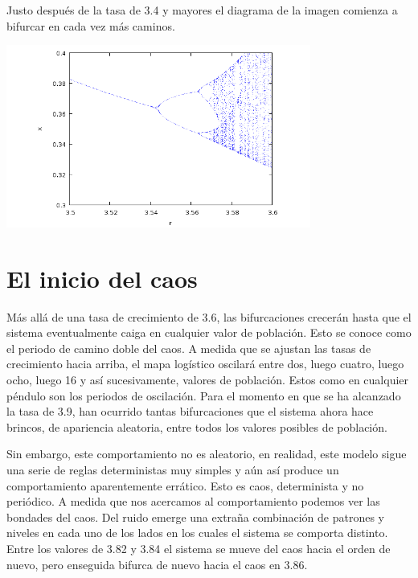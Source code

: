 \documentclass{article} %
\begin{document}
Justo después de la tasa de 3.4 y mayores el diagrama de la imagen comienza a bifurcar en cada vez más caminos. 


\begin{center}

	\includegraphics[width=10cm]{5.png}
    
\end{center}


\section*{El inicio del caos}

Más allá de una tasa de crecimiento de 3.6, las bifurcaciones crecerán hasta que el sistema eventualmente caiga en cualquier valor de población. Esto se conoce como el periodo de camino doble del caos. A medida que se ajustan las tasas de crecimiento hacia arriba, el mapa logístico oscilará entre dos, luego cuatro, luego ocho, luego 16 y así sucesivamente, valores de población. Estos como en cualquier péndulo son los periodos de oscilación. Para el momento en que se ha alcanzado la tasa de 3.9, han ocurrido tantas bifurcaciones que el sistema ahora hace brincos, de apariencia aleatoria, entre todos los valores posibles de población. 

\vspace{0.5 cm}

Sin embargo, este comportamiento no es aleatorio, en realidad, este modelo sigue una serie de reglas deterministas muy simples y aún así produce un comportamiento aparentemente errático. Esto es caos, determinista y no periódico. A medida que nos acercamos al comportamiento podemos ver las bondades del caos. Del ruido emerge una extraña combinación de patrones y niveles en cada uno de los lados en los cuales el sistema se comporta distinto. Entre los valores de 3.82 y 3.84 el sistema se mueve del caos hacia el orden de nuevo, pero enseguida bifurca de nuevo hacia el caos en 3.86.
\end{document}

